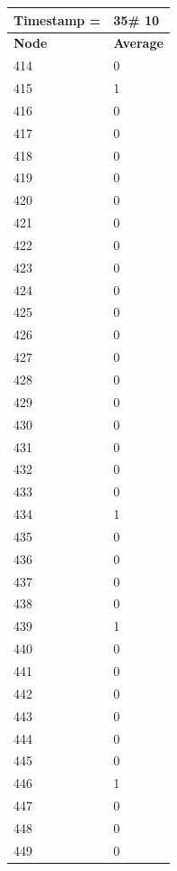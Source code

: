\begin{tabular}{|l||l|}
\hline
\textbf{Timestamp =} & \textbf{35}\# 10\\\hline
	\textbf{Node} & \textbf{Average} \\ \hline
\hline
	414 & 0 \\ \hline
	415 & 1 \\ \hline
	416 & 0 \\ \hline
	417 & 0 \\ \hline
	418 & 0 \\ \hline
	419 & 0 \\ \hline
	420 & 0 \\ \hline
	421 & 0 \\ \hline
	422 & 0 \\ \hline
	423 & 0 \\ \hline
	424 & 0 \\ \hline
	425 & 0 \\ \hline
	426 & 0 \\ \hline
	427 & 0 \\ \hline
	428 & 0 \\ \hline
	429 & 0 \\ \hline
	430 & 0 \\ \hline
	431 & 0 \\ \hline
	432 & 0 \\ \hline
	433 & 0 \\ \hline
	434 & 1 \\ \hline
	435 & 0 \\ \hline
	436 & 0 \\ \hline
	437 & 0 \\ \hline
	438 & 0 \\ \hline
	439 & 1 \\ \hline
	440 & 0 \\ \hline
	441 & 0 \\ \hline
	442 & 0 \\ \hline
	443 & 0 \\ \hline
	444 & 0 \\ \hline
	445 & 0 \\ \hline
	446 & 1 \\ \hline
	447 & 0 \\ \hline
	448 & 0 \\ \hline
	449 & 0 \\ \hline
\end{tabular}

